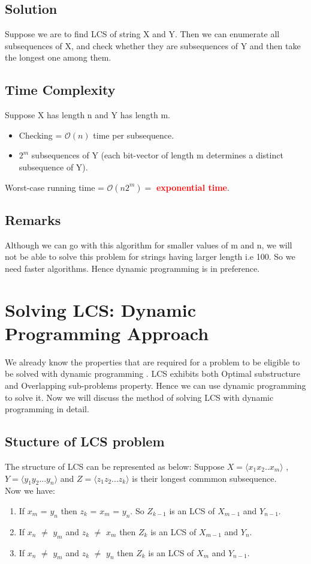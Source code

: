 \documentclass{report}
\begin{document}
    \section{Solution}
    Suppose we are to find LCS of string X and Y.
    Then we can enumerate all subsequences of X, and check whether they are subsequences of Y and then take the longest one among them.
    \section{Time Complexity}
    Suppose X has length n and Y has length m.
    \begin{itemize}
        \item Checking = $\mathcal{O}(n)$ time per subsequence.
        \item $2^m$ subsequences of Y (each bit-vector of length m determines a distinct subsequence of Y).
    \end{itemize}
    Worst-case running time = $\mathcal{O}(n2^m) = $ \textcolor{red}{\textbf{exponential time}}.
    
    \section{Remarks}
    Although we can go with this algorithm for smaller values of m and n, we will not be able to solve this problem for strings having larger length i.e 100. So we need faster algorithms. Hence dynamic programming is in preference.
    \chapter{Solving LCS: Dynamic Programming Approach}
    We already know the properties that are required for a problem to be eligible to be solved with dynamic programming . LCS exhibits both Optimal substructure and Overlapping sub-problems property. Hence we can use dynamic programming to solve it. Now we will discuss the method of solving LCS with dynamic programming in detail.
    \section{Stucture of LCS problem}
    The structure of LCS can be represented as below:
    Suppose $X=\langle x_1x_2..x_m\rangle$ , $Y = \langle y_1y_2...y_n\rangle$ and $Z=\langle z_1 z_2...z_k\rangle$ is their longest commmon subsequence.\\
    Now we have:
    \begin{enumerate}
        \item If $x_m$ = $y_n$ then $z_k$ = $x_m$ = $y_n$. So $Z_{k-1}$ is an LCS of $X_{m-1}$ and $Y_{n-1}$.
        \item If $x_n$ $\neq$ $y_m$ and $z_k$ $\neq$ $x_m$ then $Z_k$ is an LCS of $X_{m-1}$ and $Y_n$.
        \item If $x_n$ $\neq$ $y_m$ and $z_k$ $\neq$ $y_n$ then $Z_k$ is an LCS of $X_{m}$ and $Y_{n-1}$.
    \end{enumerate}
\end{document}

